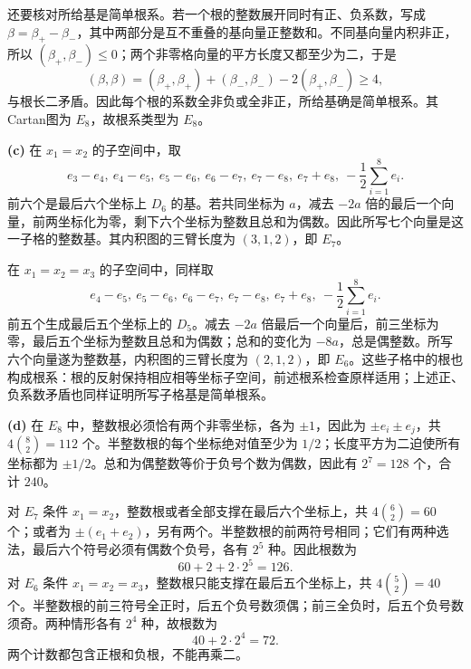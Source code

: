 \begin{solution}
还要核对所给基是简单根系。若一个根的整数展开同时有正、负系数，写成 $\beta=\beta_+-\beta_-$，其中两部分是互不重叠的基向量正整数和。不同基向量内积非正，所以 $(\beta_+,\beta_-)\le0$；两个非零格向量的平方长度又都至少为二，于是
\[
 (\beta,\beta)=(\beta_+,\beta_+)+(\beta_-,\beta_-)-2(\beta_+,\beta_-)\ge4,
\]
与根长二矛盾。因此每个根的系数全非负或全非正，所给基确是简单根系。其Cartan图为 $E_8$，故根系类型为 $E_8$。

\textbf{(c)} 在 $x_1=x_2$ 的子空间中，取
\[
 e_3-e_4,\ e_4-e_5,\ e_5-e_6,\ e_6-e_7,\ e_7-e_8,\ e_7+e_8,
 \ -\frac12\sum_{i=1}^8e_i.
\]
前六个是最后六个坐标上 $D_6$ 的基。若共同坐标为 $a$，减去 $-2a$ 倍的最后一个向量，前两坐标化为零，剩下六个坐标为整数且总和为偶数。因此所写七个向量是这一子格的整数基。其内积图的三臂长度为 $(3,1,2)$，即 $E_7$。

在 $x_1=x_2=x_3$ 的子空间中，同样取
\[
 e_4-e_5,\ e_5-e_6,\ e_6-e_7,\ e_7-e_8,\ e_7+e_8,
 \ -\frac12\sum_{i=1}^8e_i.
\]
前五个生成最后五个坐标上的 $D_5$。减去 $-2a$ 倍最后一个向量后，前三坐标为零，最后五个坐标为整数且总和为偶数；总和的变化为 $-8a$，总是偶整数。所写六个向量遂为整数基，内积图的三臂长度为 $(2,1,2)$，即 $E_6$。这些子格中的根也构成根系：根的反射保持相应相等坐标子空间，前述根系检查原样适用；上述正、负系数矛盾也同样证明所写子格基是简单根系。

\textbf{(d)} 在 $E_8$ 中，整数根必须恰有两个非零坐标，各为 $\pm1$，因此为 $\pm e_i\pm e_j$，共 $4\binom82=112$ 个。半整数根的每个坐标绝对值至少为 $1/2$；长度平方为二迫使所有坐标都为 $\pm1/2$。总和为偶整数等价于负号个数为偶数，因此有 $2^7=128$ 个，合计 $240$。

对 $E_7$ 条件 $x_1=x_2$，整数根或者全部支撑在最后六个坐标上，共 $4\binom62=60$ 个；或者为 $\pm(e_1+e_2)$，另有两个。半整数根的前两符号相同；它们有两种选法，最后六个符号必须有偶数个负号，各有 $2^5$ 种。因此根数为
\[
 60+2+2\cdot2^5=126.
\]
对 $E_6$ 条件 $x_1=x_2=x_3$，整数根只能支撑在最后五个坐标上，共 $4\binom52=40$ 个。半整数根的前三符号全正时，后五个负号数须偶；前三全负时，后五个负号数须奇。两种情形各有 $2^4$ 种，故根数为
\[
 40+2\cdot2^4=72.
\]
两个计数都包含正根和负根，不能再乘二。
\end{solution}

